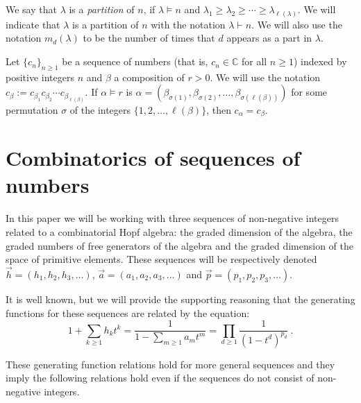 \documentclass[11pt]{amsart}
\newcommand{\defncolor}{\color{darkred}}
\newcommand{\defn}[1]{{\defncolor\emph{#1}}} %
\theoremstyle{definition}
\numberwithin{equation}{section}
\begin{document}
We say that $\lambda$ is a \defn{partition} of $n$, if $\lambda \vDash n$ and
$\lambda_1 \geq \lambda_2 \geq \cdots \geq \lambda_{\ell(\lambda)}$.  We will indicate that $\lambda$ is a partition
of $n$ with the notation $\lambda \vdash n$.  We will also use the notation $m_d(\lambda)$ to be the number of times
that $d$ appears as a part in $\lambda$.

Let $\{ c_n \}_{n \geq 1}$ be a sequence of numbers (that is, $c_n \in \mathbb{C}$ for all $n \geq 1$)
indexed by positive integers $n$ and $\beta$
a composition of $r > 0$.  We will use the
notation $c_\beta := c_{\beta_1} c_{\beta_2} \cdots c_{\beta_{\ell(\beta)}}$.
If $\alpha \vDash r$ is $\alpha = (\beta_{\sigma(1)}, \beta_{\sigma(2)}, \ldots, \beta_{\sigma(\ell(\beta))})$
for some permutation $\sigma$ of the integers $\{1,2, \ldots, \ell(\beta)\}$, then $c_\alpha = c_\beta$.

\section{Combinatorics of sequences of numbers}

In this paper we will be working with three sequences of non-negative integers related to a combinatorial Hopf
algebra: the graded dimension of the algebra, the graded numbers of free generators of the algebra and the
graded dimension of the space of primitive elements.  These sequences will be respectively denoted $\vec{h} = (h_1, h_2, h_3, \ldots)$,
$\vec{a} = (a_1, a_2, a_3, \ldots)$ and $\vec{p} = (p_1, p_2, p_3, \ldots)$.

It is well known, but we will provide the supporting reasoning
that the generating functions for these sequences
are related by the equation:
\begin{equation}\label{eq:gf_relation}
1 + \sum_{k \geq 1} h_k t^k = \frac{1}{1 - \sum_{m \geq 1} a_m t^m} = \prod_{d \geq 1} \frac{1}{(1-t^d)^{p_d}}~.
\end{equation}

These generating function relations hold for more general sequences and they imply the following relations
hold even if the sequences do not consist of non-negative integers.
\end{document}

